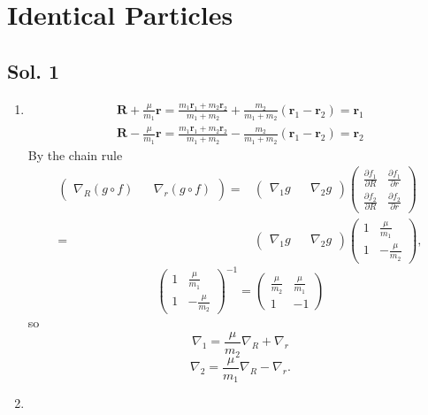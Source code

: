 \section{Identical Particles}
\subsection*{Sol. 1}
\begin{enumerate}
    \item 
    \begin{align*}
        \bm R + \frac{\mu}{m_1}\bm r= 
        \frac{m_1\bm r_1+m_2\bm r_2}{m_1+m_2}
        +
        \frac{m_2}{m_1+m_2}
        (\bm r_1-\bm r_2)
        =\bm r_1
    \end{align*}
    \begin{align*}
        \bm R - \frac{\mu}{m_1}\bm r= 
        \frac{m_1\bm r_1+m_2\bm r_2}{m_1+m_2}
        -
        \frac{m_2}{m_1+m_2}
        (\bm r_1-\bm r_2)
        =\bm r_2
    \end{align*}
    By the chain rule
    \begin{align*}
        \begin{pmatrix}
        \nabla_R(g\circ f) && \nabla_r(g\circ f)
        \end{pmatrix}
        =&
        \begin{pmatrix}
        \nabla_1 g && \nabla_2g
        \end{pmatrix}
        \begin{pmatrix}
            \frac{\partial f_1}{\partial R} & \frac{\partial f_1}{\partial r}\\
            \frac{\partial f_2}{\partial R} & \frac{\partial f_2}{\partial r}
        \end{pmatrix}\\
        =&
        \begin{pmatrix}
        \nabla_1 g && \nabla_2g
        \end{pmatrix}
        \begin{pmatrix}
            1 & \frac{\mu}{m_1}\\
            1 & -\frac{\mu}{m_2}
        \end{pmatrix},
    \end{align*}
    $$
    \begin{pmatrix}
            1 & \frac{\mu}{m_1}\\
            1 & -\frac{\mu}{m_2}
        \end{pmatrix}^{-1}
        =\begin{pmatrix}
            \frac{\mu}{m_2} & \frac{\mu}{m_1}\\
            1 & -1
        \end{pmatrix}
    $$
    so 
    $$
    \nabla_1 = \frac{\mu}{m_2}\nabla_R +\nabla_r
    $$
    $$
    \nabla_2 = \frac{\mu}{m_1}\nabla_R -\nabla_r.
    $$
    \item 


\end{enumerate}
